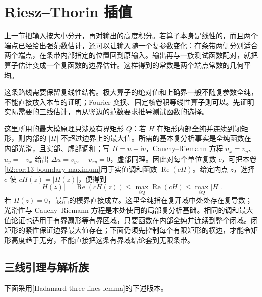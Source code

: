 \section{Riesz–Thorin 插值}
\label{b2:sec:1704}

上一节把输入按大小分开，再对输出的高度积分。若算子本身是线性的，而且两个端点已经给出强范数估计，还可以让输入随一个复参数变化：在条带两侧分别适合两个端点，在条带内部指定的位置回到原输入。输出再与一族测试函数配对，就把算子估计变成一个复函数的边界估计。这样得到的常数是两个端点常数的几何平均。

\ProseParagraphBreak

这条路线需要保留复线性结构。极大算子的绝对值和上确界一般不随复参数全纯，不能直接放入本节的证明；Fourier 变换、固定核卷积等线性算子则可以。先证明实际需要的三线估计，再从竖边的范数要求推导测试函数的选择。

\ProseParagraphBreak

这里所用的最大模原理只涉及有界矩形 \(Q\)：若 \(H\) 在矩形内部全纯并连续到闭矩形，则内部的 \(|H|\) 不超过边界上的最大值。所需的基本复分析事实是全纯函数在内部光滑，且实部、虚部调和；写 \(H=u+\mathrm iv\)，Cauchy--Riemann 方程 \(u_x=v_y\)、\(u_y=-v_x\) 给出 \(\Delta u=v_{yx}-v_{xy}=0\)，虚部同理。因此对每个单位复数 \(c\)，可把本卷\cref{b2:cor:13-boundary-maximum}用于实值调和函数 \(\operatorname{Re}(cH)\)。给定内点 \(z\)，选择 \(c\) 使 \(cH(z)=|H(z)|\)，便得到
\[
 |H(z)|=\operatorname{Re}(cH(z))
 \leq\max_{\partial Q}\operatorname{Re}(cH)
 \leq\max_{\partial Q}|H|.
\]
若 \(H(z)=0\)，最后的模界直接成立。这里全纯指在复开域中处处存在复导数；光滑性与 Cauchy--Riemann 方程是本处使用的局部复分析基础。相同的调和最大值论证也适用于有界扇形等有界区域，只要函数在内部全纯并连续到整个闭域。闭矩形的紧性保证边界最大值存在；下面仍须先控制每个有限矩形的横边，才能令矩形高度趋于无穷，不能直接把这条有界域结论套到无限条带。

\subsection{三线引理与解析族}
\label{b2:subsec:170401}

下面采用[Hadamard three-lines lemma]的下述版本。

